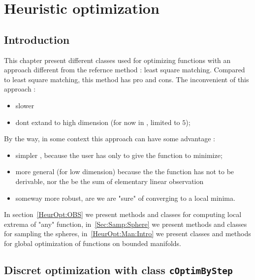 

\chapter{Heuristic optimization}



\section{Introduction}

This chapter present different classes used for optimizing
functions with an approach different from the  refernce method : least square matching.
Compared to least square matching, this method has pro and cons. The inconvenient of this approach :

\begin{itemize}
   \item  slower 
   \item  dont extand to high dimension (for now in \PPP , limited to $5$);
\end{itemize}

By the way,  in some context this approach can have some advantage :

\begin{itemize}
   \item  simpler , because the user has only to give the function to minimize;

   \item  more general (for low dimension) because the
          the function has not to be  derivable, nor the be the sum of elementary linear observation

   \item  someway more robust, are we are "sure" of converging to a local minima.
\end{itemize}


In section~\ref{HeurOpt:OBS} we present methods and classes for computing
local extrema of "any" function, in~\ref{Sec:Samp:Sphere} we present methods and classes
for sampling the spheres, in~\ref{HeurOpt:Man:Intro} we present classes and methods
for global optimization of functions on bounded manifolds.


\section{Discret optimization with class {\tt cOptimByStep}}


